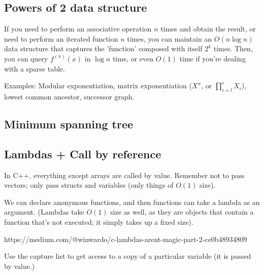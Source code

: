 \documentclass[12pt]{article}
\begin{document}
\subsection{Powers of 2 data structure}
If you need to perform an associative operation
$n$ times and obtain the result, or need to perform an iterated function
$n$ times, you can maintain an $O(n\log n)$ data structure
that captures the 'function' composed with itself
$2^k$ times. Then, you can query $f^{(n)}(x)$ in $\log n$ time, or even $O(1)$ time
if you're dealing with a sparse table.

Examples: Modular exponentiation, matrix exponentiation ($X^n$, or $\prod_{i=l}^r X_i$), lowest common ancestor,
successor graph.

\subsection{Minimum spanning tree}

\subsection{Lambdas + Call by reference}

In C++, everything except arrays are called by value. Remember not to pass vectors; only pass structs and
variables (only things of $O(1)$ size).

We can declare anonymous functions, and then functions can take a lambda as an argument. (Lambdas take $O(1)$ size as well,
as they are objects that contain a function that's not executed; it simply takes up a fixed size).

https://medium.com/@winwardo/c-lambdas-arent-magic-part-2-ce0b48934809


Use the capture list to get access to a copy of a particular variable (it is passed by value.)
\end{document}
